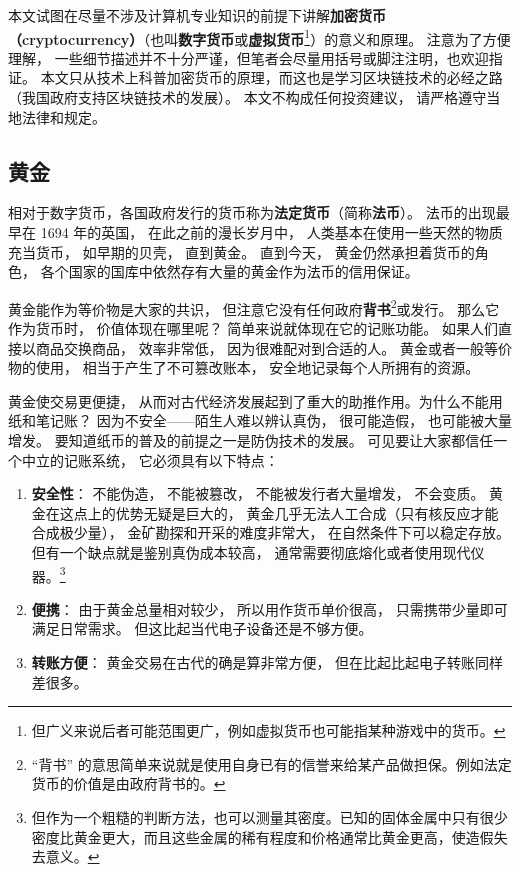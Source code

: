
本文试图在尽量不涉及计算机专业知识的前提下讲解\textbf{加密货币（cryptocurrency）}（也叫\textbf{数字货币}或\textbf{虚拟货币}\footnote{但广义来说后者可能范围更广，例如虚拟货币也可能指某种游戏中的货币。}）的意义和原理。 注意为了方便理解， 一些细节描述并不十分严谨，但笔者会尽量用括号或脚注注明，也欢迎指证。 本文只从技术上科普加密货币的原理，而这也是学习区块链技术的必经之路（我国政府支持区块链技术的发展）。 本文不构成任何投资建议， 请严格遵守当地法律和规定。

\subsection{黄金}
相对于数字货币，各国政府发行的货币称为\textbf{法定货币}（简称\textbf{法币}）。 法币的出现最早在 1694 年的英国， 在此之前的漫长岁月中， 人类基本在使用一些天然的物质充当货币， 如早期的贝壳， 直到黄金。 直到今天， 黄金仍然承担着货币的角色， 各个国家的国库中依然存有大量的黄金作为法币的信用保证。

黄金能作为等价物是大家的共识， 但注意它没有任何政府\textbf{背书}\footnote{“背书” 的意思简单来说就是使用自身已有的信誉来给某产品做担保。例如法定货币的价值是由政府背书的。}或发行。 那么它作为货币时， 价值体现在哪里呢？ 简单来说就体现在它的记账功能。 如果人们直接以商品交换商品， 效率非常低， 因为很难配对到合适的人。 黄金或者一般等价物的使用， 相当于产生了不可篡改账本， 安全地记录每个人所拥有的资源。

黄金使交易更便捷， 从而对古代经济发展起到了重大的助推作用。为什么不能用纸和笔记账？ 因为不安全——陌生人难以辨认真伪， 很可能造假， 也可能被大量增发。 要知道纸币的普及的前提之一是防伪技术的发展。 可见要让大家都信任一个中立的记账系统， 它必须具有以下特点：
\begin{enumerate}
\item \textbf{安全性}： 不能伪造， 不能被篡改， 不能被发行者大量增发， 不会变质。 黄金在这点上的优势无疑是巨大的， 黄金几乎无法人工合成（只有核反应才能合成极少量）， 金矿勘探和开采的难度非常大， 在自然条件下可以稳定存放。 但有一个缺点就是鉴别真伪成本较高， 通常需要彻底熔化或者使用现代仪器。\footnote{但作为一个粗糙的判断方法，也可以测量其密度。已知的固体金属中只有很少密度比黄金更大，而且这些金属的稀有程度和价格通常比黄金更高，使造假失去意义。}
\item \textbf{便携}： 由于黄金总量相对较少， 所以用作货币单价很高， 只需携带少量即可满足日常需求。 但这比起当代电子设备还是不够方便。
\item \textbf{转账方便}： 黄金交易在古代的确是算非常方便， 但在比起比起电子转账同样差很多。
\end{enumerate}

